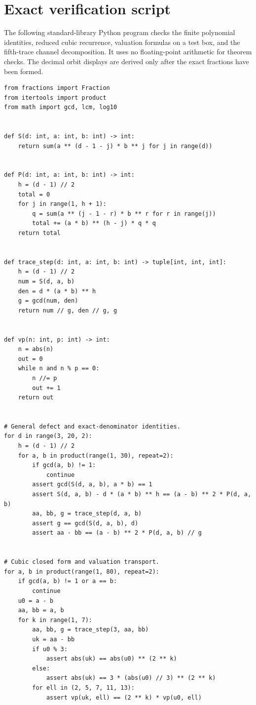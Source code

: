 \documentclass[11pt,oneside]{article}
\theoremstyle{definition}
\theoremstyle{remark}
\begin{document}
\section{Exact verification script}
\label{app:code}

The following standard-library Python program checks the finite polynomial identities,
reduced cubic recurrence, valuation formulas on a test box, and the fifth-trace channel
decomposition.  It uses no floating-point arithmetic for theorem checks.  The decimal orbit
displays are derived only after the exact fractions have been formed.

\begin{lstlisting}[style=pythonstyle,caption={Exact centered-trace verifier.}]
from fractions import Fraction
from itertools import product
from math import gcd, lcm, log10


def S(d: int, a: int, b: int) -> int:
    return sum(a ** (d - 1 - j) * b ** j for j in range(d))


def P(d: int, a: int, b: int) -> int:
    h = (d - 1) // 2
    total = 0
    for j in range(1, h + 1):
        q = sum(a ** (j - 1 - r) * b ** r for r in range(j))
        total += (a * b) ** (h - j) * q * q
    return total


def trace_step(d: int, a: int, b: int) -> tuple[int, int, int]:
    h = (d - 1) // 2
    num = S(d, a, b)
    den = d * (a * b) ** h
    g = gcd(num, den)
    return num // g, den // g, g


def vp(n: int, p: int) -> int:
    n = abs(n)
    out = 0
    while n and n % p == 0:
        n //= p
        out += 1
    return out


# General defect and exact-denominator identities.
for d in range(3, 20, 2):
    h = (d - 1) // 2
    for a, b in product(range(1, 30), repeat=2):
        if gcd(a, b) != 1:
            continue
        assert gcd(S(d, a, b), a * b) == 1
        assert S(d, a, b) - d * (a * b) ** h == (a - b) ** 2 * P(d, a, b)
        aa, bb, g = trace_step(d, a, b)
        assert g == gcd(S(d, a, b), d)
        assert aa - bb == (a - b) ** 2 * P(d, a, b) // g


# Cubic closed form and valuation transport.
for a, b in product(range(1, 80), repeat=2):
    if gcd(a, b) != 1 or a == b:
        continue
    u0 = a - b
    aa, bb = a, b
    for k in range(1, 7):
        aa, bb, g = trace_step(3, aa, bb)
        uk = aa - bb
        if u0 % 3:
            assert abs(uk) == abs(u0) ** (2 ** k)
        else:
            assert abs(uk) == 3 * (abs(u0) // 3) ** (2 ** k)
        for ell in (2, 5, 7, 11, 13):
            assert vp(uk, ell) == (2 ** k) * vp(u0, ell)



\end{lstlisting}
\end{document}
